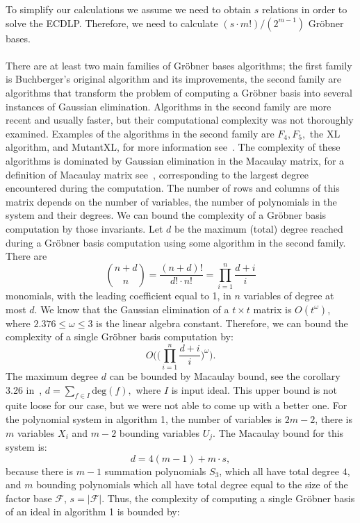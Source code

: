 \documentclass[thesis=M,english]{FITthesis}[2012/10/20]
\theoremstyle{remark}
\theoremstyle{definition}
\begin{document}
\noindent To simplify our calculations we assume we need to obtain $s$ relations in order to solve the ECDLP. Therefore, we need to calculate $ (s\cdot m!)/(2^{m-1})$ Gröbner bases. \\
\\
\noindent There are at least two main families of Gröbner bases algorithms; the first family is Buchberger's original algorithm and its improvements, the second family are algorithms that transform the problem of computing a Gröbner basis into several instances of Gaussian elimination. Algorithms in the second family are more recent and usually faster, but their computational complexity was not thoroughly examined. Examples of the algorithms in the second family are $F_4, F_5,$ the XL algorithm, and MutantXL, for more information see~\cite{grobComp}. The complexity of these algorithms is dominated by Gaussian elimination in the Macaulay matrix, for a definition of Macaulay matrix see~\cite{macal}, corresponding to the largest degree encountered during the computation. The number of rows and columns of this matrix depends on the number of variables, the number of polynomials in the system and their degrees. We can bound the complexity of a Gröbner basis computation by those invariants. Let $d$ be the maximum (total) degree reached during a Gröbner basis computation using some algorithm in the second family. There are 
$$
\binom{n+d}{n} = \frac{(n+d)!}{d!\cdot n!} = \prod_{i=1}^{n}\frac{d+i}{i}
$$
monomials, with the leading coefficient equal to 1, in $n$ variables of degree at most $d$. We know that the Gaussian elimination of a $t\times t$ matrix is $O(t^\omega)$, where $2.376 \leq \omega\leq 3$ is the linear algebra constant. Therefore, we can bound the complexity of a single Gröbner basis computation by:
$$O\Bigg(\bigg(\prod_{i=1}^{n}\frac{d+i}{i}\bigg)^\omega\Bigg).$$
The maximum degree $d$ can be bounded by Macaulay bound, see the corollary 3.26 in~\cite{grobComp}, $d=\sum_{f \in I}\text{deg}(f),$ where $I$ is input ideal. This upper bound is not quite loose for our case, but we were not able to come up with a better one. For the polynomial system in algorithm 1, the number of variables is $2m-2$, there is $m$ variables $X_i$ and $m-2$ bounding variables $U_j$. The Macaulay bound for this system is: 
$$
d = 4(m-1) + m\cdot s,
$$
because there is $m - 1$ summation polynomials $S_3$, which all have total degree $4$, and $m$ bounding polynomials which all have total degree equal to the size of the factor base $\mathcal{F}$, $s = |\mathcal{F}|$. Thus, the complexity of computing a single Gröbner basis of an ideal in algorithm 1 is bounded by:
\end{document}
